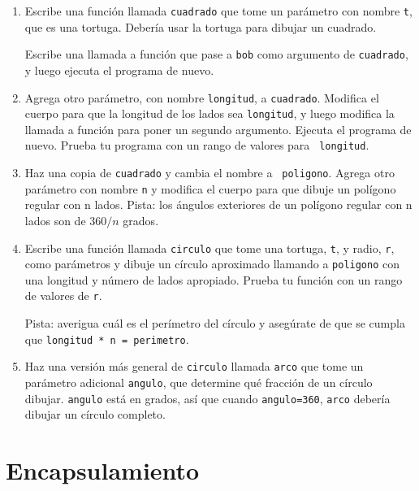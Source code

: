 \documentclass[10pt]{book}
\begin{document}
\begin{enumerate}

\item Escribe una función llamada {\tt cuadrado} que tome un parámetro
con nombre {\tt t}, que es una tortuga.  Debería usar la tortuga para dibujar
un cuadrado.

Escribe una llamada a función que pase a {\tt bob} como argumento de 
{\tt cuadrado}, y luego ejecuta el programa de nuevo.

\item Agrega otro parámetro, con nombre {\tt longitud}, a {\tt cuadrado}.
Modifica el cuerpo para que la longitud de los lados sea {\tt longitud}, y luego
modifica la llamada a función para poner un segundo argumento.  Ejecuta el
programa de nuevo.  Prueba tu programa con un rango de valores para {\tt
longitud}.

\item Haz una copia de {\tt cuadrado} y cambia el nombre a {\tt
  poligono}.  Agrega otro parámetro con nombre {\tt n} y modifica el cuerpo
  para que dibuje un polígono regular con n lados.  Pista: los ángulos exteriores
  de un polígono regular con n lados son de $360/n$ grados.   

\item Escribe una función llamada {\tt circulo} que tome una tortuga,
{\tt t}, y radio, {\tt r}, como parámetros y dibuje un círculo
aproximado llamando a {\tt poligono} con una longitud y
número de lados apropiado.  Prueba tu función con un rango de valores
de {\tt r}.   

Pista: averigua cuál es el perímetro del círculo y asegúrate de que
se cumpla que {\tt longitud * n = perimetro}.

\item Haz una versión más general de {\tt circulo} llamada {\tt arco}
que tome un parámetro adicional {\tt angulo}, que determine
qué fracción de un círculo dibujar.  {\tt angulo} está en
grados, así que cuando {\tt angulo=360}, {\tt arco} debería dibujar un círculo
completo.

\end{enumerate}


\section{Encapsulamiento}
\end{document}
